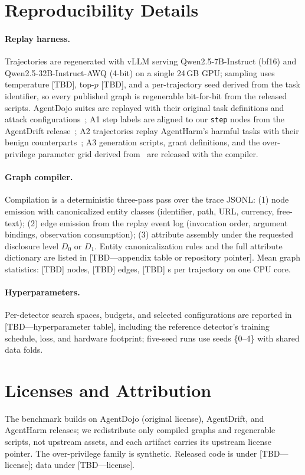 \appendix

\section{Reproducibility Details}
\label{app:repro}

\paragraph{Replay harness.} Trajectories are regenerated with vLLM serving Qwen2.5-7B-Instruct (bf16) and Qwen2.5-32B-Instruct-AWQ (4-bit) on a single 24\,GB GPU; sampling uses temperature [TBD], top-$p$ [TBD], and a per-trajectory seed derived from the task identifier, so every published graph is regenerable bit-for-bit from the released scripts. AgentDojo suites are replayed with their original task definitions and attack configurations~\cite{debenedetti2024agentdojo}; A1 step labels are aligned to our \texttt{step} nodes from the AgentDrift release~\cite{pinjari2026agentdrift}; A2 trajectories replay AgentHarm's harmful tasks with their benign counterparts~\cite{andriushchenko2024agentharm}; A3 generation scripts, grant definitions, and the over-privilege parameter grid derived from~\cite{yang2026when} are released with the compiler.

\paragraph{Graph compiler.} Compilation is a deterministic three-pass pass over the trace JSONL: (1) node emission with canonicalized entity classes (identifier, path, URL, currency, free-text); (2) edge emission from the replay event log (invocation order, argument bindings, observation consumption); (3) attribute assembly under the requested disclosure level $D_0$ or $D_1$. Entity canonicalization rules and the full attribute dictionary are listed in [TBD---appendix table or repository pointer]. Mean graph statistics: [TBD] nodes, [TBD] edges, [TBD] s per trajectory on one CPU core.

\paragraph{Hyperparameters.} Per-detector search spaces, budgets, and selected configurations are reported in [TBD---hyperparameter table], including the reference detector's training schedule, loss, and hardware footprint; five-seed runs use seeds \{0--4\} with shared data folds.

\section{Licenses and Attribution}
\label{app:license}

The benchmark builds on AgentDojo (original license), AgentDrift, and AgentHarm releases; we redistribute only compiled graphs and regenerable scripts, not upstream assets, and each artifact carries its upstream license pointer. The over-privilege family is synthetic. Released code is under [TBD---license]; data under [TBD---license].
